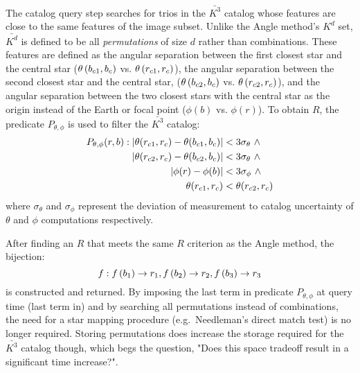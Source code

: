 The catalog query step searches for trios in the $\bar{K^3}$ catalog whose features are close to the same features of
the image subset.
Unlike the Angle method's $K^d$ set, $\bar{K^d}$ is defined to be all \textit{permutations} of size $d$ rather than
combinations.
These features are defined as the angular separation between the first closest star and the central star
($\theta\left(b_{c1}, b_c\right)$ vs. $ \theta\left(r_{c1}, r_c\right)$), the
angular separation between the second closest star and the central star, ($\theta\left(b_{c2},
b_c\right) $ vs. $\theta\left(r_{c2}, r_c\right)$),
and the angular separation between the two closest stars with the central star as the origin instead of the Earth or 
focal point ($\phi(b) $ vs. $ \phi(r)$).
To obtain $R$, the predicate $P_{\theta, \phi}$ is used to filter the $\bar{K^3}$ catalog:
\begin{equation}
    \begin{aligned}
        P_{\theta, \phi} (r, b): \left\lvert \theta(r_{c1}, r_c) - \theta(b_{c1}, b_c)\right\rvert
        &< 3 \sigma_{\theta} \ \land \\ \left\lvert \theta(r_{c2}, r_c) - \theta(b_{c2}, 
        b_c)\right\rvert &< 3 \sigma_{\theta} \ \land \\ \left\lvert \phi(r) - \phi(b)\right\rvert &< 3 
        \sigma_\phi \ \land \\\theta(r_{c1}, r_c) &< \theta(r_{c2}, r_c)
    \end{aligned}
\end{equation}
where $\sigma_{\theta}$ and $\sigma_{\phi}$ represent the deviation of measurement to catalog uncertainty of
$\theta$ and $\phi$ computations respectively.

After finding an $R$ that meets the same $R$ criterion as the Angle method, the bijection:
\begin{equation}
    f: f\left(b_1\right) \rightarrow r_1, f\left(b_2\right) \rightarrow r_2, f\left(b_3\right)
    \rightarrow r_3
\end{equation}
is constructed and returned.
By imposing the last term in  predicate $P_{\theta, \phi}$ at query time (last term in) and by searching all
permutations instead of combinations, the need for a star mapping procedure (e.g.\ Needleman's direct match test) is
no longer required.
Storing permutations does increase the storage required for the $\bar{K^3}$ catalog though, which begs the question,
"Does this space tradeoff result in a significant time increase?".


